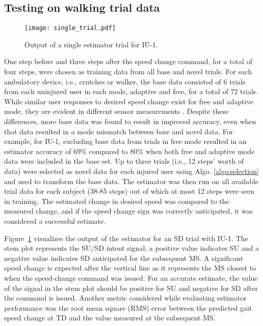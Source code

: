 \subsection{Testing on walking trial data}

\begin{figure}
	\centering
	\texttt{[image: single\_trial.pdf]}
	\caption{Output of a single estimator trial for IU-1.}\label{fig:single_trial}
\end{figure}

One step before and three steps after the speed change command, for a total of four steps, were chosen as training data from all base and novel trials. For each ambulatory device, i.e., crutches or walker, the base data consisted of 6 trials from each uninjured user in each mode, adaptive and free, for a total of 72 trials. While similar user responses to desired speed change exist for free and adaptive mode, they are evident in different sensor measurements \cite{karulkar2021using}. Despite these differences, more base data was found to result in improved accuracy, even when that data resulted in a mode mismatch between base and novel data. For example, for IU-1, excluding base data from trials in free mode resulted in an estimator accuracy of 69\% compared to 80\% when both free and adaptive mode data were included in the base set. Up to three trials (i.e., 12 steps' worth of data) were selected as novel data for each injured user using Algo. \ref{algo:selection} and used to transform the base data. The estimator was then run on all available trial data for each subject (38-85 steps) out of which at most 12 steps were seen in training. The estimated change in desired speed was compared to the measured change, and if the speed change sign was correctly anticipated, it was considered a successful estimate.

Figure~\ref{fig:single_trial} visualizes the output of the estimator for an SD trial with IU-1. The stem plot represents the SU/SD intent signal; a positive value indicates SU and a negative value indicates SD anticipated for the subsequent MS. A significant speed change is expected after the vertical line as it represents the MS closest to when the speed-change command was issued. For an accurate estimate, the value of the signal in the stem plot should be positive for SU and negative for SD after the command is issued. Another metric considered while evaluating estimator performance was the root mean square (RMS) error between the predicted gait speed change at TD and the value measured at the subsequent MS. 

